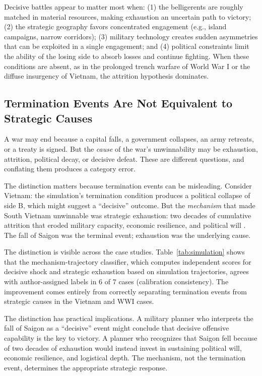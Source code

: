 Decisive battles appear to matter most when: (1) the belligerents are roughly matched in material resources, making exhaustion an uncertain path to victory; (2) the strategic geography favors concentrated engagement (e.g., island campaigns, narrow corridors); (3) military technology creates sudden asymmetries that can be exploited in a single engagement; and (4) political constraints limit the ability of the losing side to absorb losses and continue fighting. When these conditions are absent, as in the prolonged trench warfare of World War I or the diffuse insurgency of Vietnam, the attrition hypothesis dominates.

\subsection{Termination Events Are Not Equivalent to Strategic Causes}

A war may end because a capital falls, a government collapses, an army retreats, or a treaty is signed. But the \emph{cause} of the war's unwinnability may be exhaustion, attrition, political decay, or decisive defeat. These are different questions, and conflating them produces a category error.

The distinction matters because termination events can be misleading. Consider Vietnam: the simulation's termination condition produces a political collapse of side B, which might suggest a ``decisive'' outcome. But the \emph{mechanism} that made South Vietnam unwinnable was strategic exhaustion: two decades of cumulative attrition that eroded military capacity, economic resilience, and political will \citep{herring2002}. The fall of Saigon was the terminal event; exhaustion was the underlying cause.

The distinction is visible across the case studies. Table~\ref{tab:simulation} shows that the mechanism-trajectory classifier, which computes independent scores for decisive shock and strategic exhaustion based on simulation trajectories, agrees with author-assigned labels in 6 of 7 cases (calibration consistency). The improvement comes entirely from correctly separating termination events from strategic causes in the Vietnam and WWI cases.

The distinction has practical implications. A military planner who interprets the fall of Saigon as a ``decisive'' event might conclude that decisive offensive capability is the key to victory. A planner who recognizes that Saigon fell because of two decades of exhaustion would instead invest in sustaining political will, economic resilience, and logistical depth. The mechanism, not the termination event, determines the appropriate strategic response.

